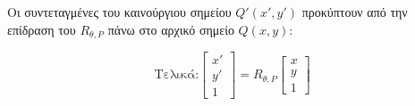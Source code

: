 \begin{solution}
Οι συντεταγμένες του καινούργιου σημείου $Q'(x', y')$ προκύπτουν από την επίδραση του $R_{\theta,P}$ πάνω στο αρχικό σημείο $Q(x, y)$:

\[
\text{Τελικά:}
\begin{bmatrix}
x' \\ y' \\ 1
\end{bmatrix}
=
R_{\theta,P}
\begin{bmatrix}
x \\ y \\ 1
\end{bmatrix}
\]
\end{solution}